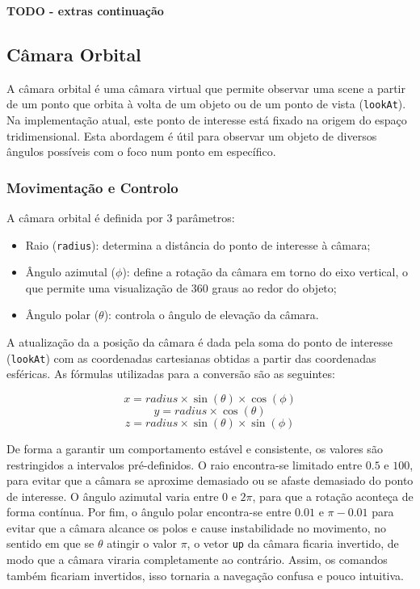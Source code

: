 \documentclass[12pt, a4paper]{article}
\begin{document}
\textbf{\color{red} TODO - extras continuação}

\subsection{Câmara Orbital}

A câmara orbital é uma câmara virtual que permite observar uma scene a partir de um ponto que
orbita à volta de um objeto ou de um ponto de vista (\texttt{lookAt}). Na implementação atual, este
ponto de interesse está fixado na origem do espaço tridimensional. Esta abordagem é útil para
observar um objeto de diversos ângulos possíveis com o foco num ponto em específico.

\subsubsection{Movimentação e Controlo}

A câmara orbital é definida por 3 parâmetros:
\begin{itemize}
    \item Raio (\texttt{radius}): determina a distância do ponto de interesse à câmara;
    \item Ângulo azimutal ($\phi$): define a rotação da câmara em torno do eixo vertical,
    o que permite uma visualização de 360 graus ao redor do objeto;
    \item Ângulo polar ($\theta$): controla o ângulo de elevação da câmara.
\end{itemize}

A atualização da a posição da câmara é dada pela soma do ponto de interesse (\texttt{lookAt}) com
as coordenadas cartesianas obtidas a partir das coordenadas esféricas. As fórmulas utilizadas para
a conversão são as seguintes:

$$x = radius \times \sin(\theta) \times \cos(\phi)$$
$$y = radius \times \cos(\theta)$$
$$z = radius \times \sin(\theta) \times \sin(\phi)$$

De forma a garantir um comportamento estável e consistente, os valores são restringidos a
intervalos pré-definidos. O raio encontra-se limitado entre $0.5$ e $100$, para evitar que a câmara
se aproxime demasiado ou se afaste demasiado do ponto de interesse. O ângulo azimutal varia entre
$0$ e $2\pi$, para que a rotação aconteça de forma contínua. Por fim, o ângulo polar encontra-se
entre $0.01$ e $\pi - 0.01$ para evitar que a câmara alcance os polos e cause instabilidade no
movimento, no sentido em que se $\theta$ atingir o valor $\pi$, o vetor \texttt{up} da câmara
ficaria invertido, de modo que a câmara viraria completamente ao contrário. Assim, os comandos
também ficariam invertidos, isso tornaria a navegação confusa e pouco intuitiva.
\end{document}
